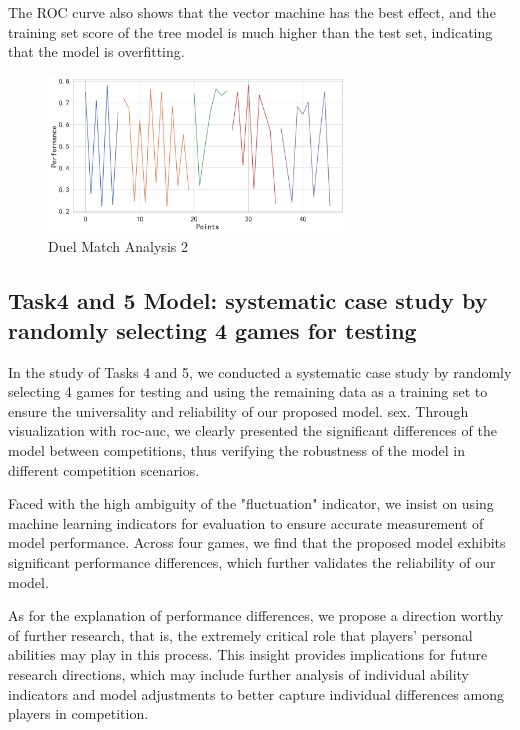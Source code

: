 \documentclass{article}
\begin{document}
The ROC curve also shows that the vector machine has the best effect, and the training set score of the tree model is much higher than the test set, indicating that the model is overfitting.
\begin{figure}[H]
      \centering
      \includegraphics[width=0.7\textwidth]{duelMatch2.png}
      \caption{Duel Match Analysis 2}
\end{figure}

\subsection{Task4 and 5 Model: systematic case study by randomly selecting 4 games for testing}
In the study of Tasks 4 and 5, we conducted a systematic case study by randomly selecting 4 games for testing and using the remaining data as a training set to ensure the universality and reliability
of our proposed model. sex. Through visualization with roc-auc, we clearly presented the significant differences of the model between competitions, thus verifying the robustness of the model in different competition scenarios.

Faced with the high ambiguity of the "fluctuation" indicator, we insist on using machine learning indicators for evaluation to ensure accurate measurement of model performance. Across four games, we find that the proposed model exhibits significant
performance differences, which further validates the reliability of our model.

As for the explanation of performance differences, we propose a direction worthy of further research, that is, the extremely critical role that players' personal abilities may play in this process. This insight provides implications for future research directions,
which may include further analysis of individual ability indicators and model adjustments to better capture individual differences among players in competition.
\end{document}
